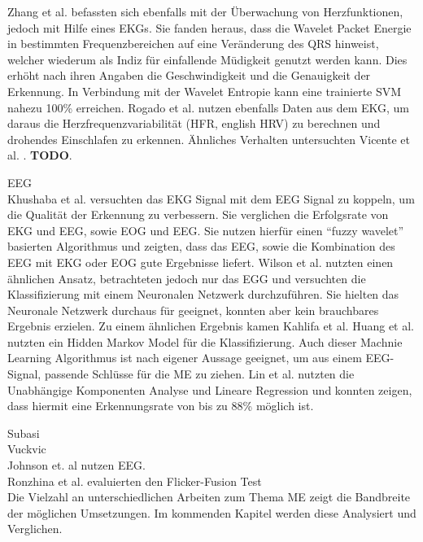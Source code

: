 {Zhang et al. \cite{zhang_6513058} befassten sich ebenfalls mit der Überwachung von Herzfunktionen, jedoch mit Hilfe eines EKGs. Sie fanden heraus, dass die Wavelet Packet Energie in bestimmten Frequenzbereichen auf eine Veränderung des QRS hinweist, welcher wiederum als Indiz für einfallende Müdigkeit genutzt werden kann. Dies erhöht nach ihren Angaben die Geschwindigkeit und die Genauigkeit der Erkennung. In Verbindung mit der Wavelet Entropie kann eine trainierte SVM nahezu 100\% erreichen. Rogado et al. \cite{Rogado_4913155} nutzen ebenfalls Daten aus dem EKG, um daraus die Herzfrequenzvariabilität (HFR, english HRV) zu berechnen und drohendes Einschlafen zu erkennen. Ähnliches Verhalten untersuchten Vicente et al. \cite{Vicente_6164509}. \textbf{TODO}.  

EEG \\
\cite{Khushaba_5580017} Khushaba et al. versuchten das EKG Signal mit dem EEG Signal zu koppeln, um die Qualität der Erkennung zu verbessern. Sie verglichen die Erfolgsrate von EKG und EEG, sowie EOG und EEG. Sie nutzen hierfür einen "`fuzzy wavelet"' basierten Algorithmus und zeigten, dass das EEG, sowie die Kombination des EEG mit EKG oder EOG gute Ergebnisse liefert. Wilson et al. \cite{wilson_890161} nutzten einen ähnlichen Ansatz, betrachteten jedoch nur das EGG und versuchten die Klassifizierung mit einem Neuronalen Netzwerk durchzuführen. Sie hielten das Neuronale Netzwerk durchaus für geeignet, konnten aber kein brauchbares Ergebnis erzielen. Zu einem ähnlichen Ergebnis kamen Kahlifa \cite{khalifa_893852} et al.
Huang et al. \cite{Huang_548971} nutzten ein Hidden Markov Model für die Klassifizierung. Auch dieser Machnie Learning Algorithmus ist nach eigener Aussage geeignet, um aus einem EEG-Signal, passende Schlüsse für die \acl{ME} zu ziehen. Lin et al. \cite{Lin05eeg-baseddrowsiness} nutzten die Unabhängige Komponenten Analyse und Lineare Regression und konnten zeigen, dass hiermit eine Erkennungsrate von bis zu 88\% möglich ist. 


Subasi \cite{Subasi:2005:ARA:1707423.1707550}\\
Vuckvic \cite{Vuckovic2002349}\\
Johnson et. al \cite{Johnson11} nutzen EEG.\\
Ronzhina et al. \cite{Ronzhina:2011:UEV:2093698.2093733} evaluierten den Flicker-Fusion Test \\

Die Vielzahl an unterschiedlichen Arbeiten zum Thema \acl{ME} zeigt die Bandbreite der möglichen Umsetzungen. Im kommenden Kapitel werden diese Analysiert und Verglichen.

}
